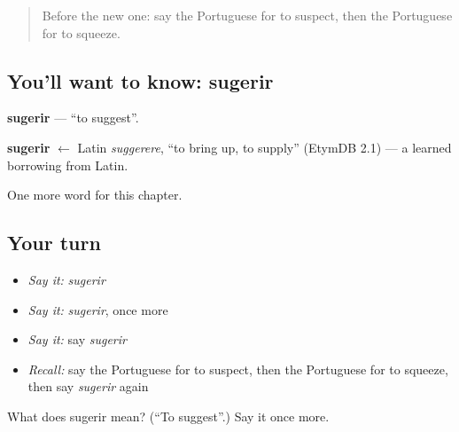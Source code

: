 \begin{quote}
Before the new one: say the Portuguese for to suspect, then the Portuguese for to squeeze.
\end{quote}

\subsection*{You'll want to know: sugerir}
\textbf{sugerir} — \textquotedblleft{}to suggest\textquotedblright{}.

\begin{cousinweb}
\textbf{sugerir} $\leftarrow$ Latin \emph{suggerere}, \textquotedblleft{}to bring up, to supply\textquotedblright{} (EtymDB 2.1) — a learned borrowing from Latin.
\end{cousinweb}

\begin{grammarlens}[title={What you've built}]
One more word for this chapter.
\end{grammarlens}

\subsection*{Your turn}
\begin{itemize}
\raggedright
  \item \emph{Say it:} \emph{sugerir}
  \item \emph{Say it:} \emph{sugerir}, once more
  \item \emph{Say it:} say \emph{sugerir}
  \item \emph{Recall:} say the Portuguese for to suspect, then the Portuguese for to squeeze, then say \emph{sugerir} again
\end{itemize}

\begin{tcolorbox}[breakable,colback=teal!4,colframe=teal!35!black,title={Before you move on}]
What does sugerir mean? (\textquotedblleft{}To suggest\textquotedblright{}.) Say it once more.
\end{tcolorbox}
